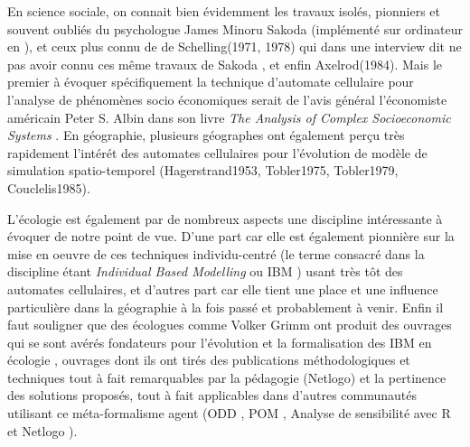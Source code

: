 En science sociale, on connait bien évidemment les travaux isolés, pionniers et souvent oubliés \autocites{Hegselmann2012, Aydinonat2007} du psychologue James Minoru Sakoda \autocite{Sakoda1949} (implémenté sur ordinateur en \autocite{Sakoda1971}), et ceux plus connu de de Schelling(1971, 1978) qui dans une interview dit ne pas avoir connu ces même travaux de Sakoda \autocite{Aydinonat2005}, et enfin Axelrod(1984). Mais le premier à évoquer spécifiquement la technique d'automate cellulaire pour l'analyse de phénomènes socio économiques serait de l'avis général l'économiste américain Peter S. Albin dans son livre \textit{The Analysis of Complex Socioeconomic Systems} \textcite{Smith1975, Ganguly2003, Benenson2004, Portugali2000}. En géographie, plusieurs géographes ont également perçu très rapidement l'intérét des automates cellulaires pour l'évolution de modèle de simulation spatio-temporel (Hagerstrand1953, Tobler1975, Tobler1979, Couclelis1985).



L'écologie est également par de nombreux aspects une discipline intéressante à évoquer de notre point de vue. D'une part car elle est également pionnière sur la mise en oeuvre de ces techniques individu-centré (le terme consacré dans la discipline étant \textit{Individual Based Modelling} ou IBM ) usant très tôt des automates cellulaires, et d'autres part car elle tient une place et une influence particulière dans la géographie à la fois passé et probablement à venir. Enfin il faut souligner que des écologues comme Volker Grimm ont produit des ouvrages qui se sont avérés fondateurs pour l'évolution et la formalisation des IBM en écologie \autocites{Grimm2004, DeAngelis2014}, ouvrages dont ils ont tirés des publications méthodologiques et techniques \autocite{Railsback2012} tout à fait remarquables par la pédagogie (Netlogo) et la pertinence des solutions proposés, tout à fait applicables dans d'autres communautés utilisant ce méta-formalisme agent (ODD \autocite{Grimm2010}, POM \autocite{Grimm2005,Grimm2011}, Analyse de sensibilité avec R et Netlogo \autocite{Thiele2011,Thiele2014a}). %

